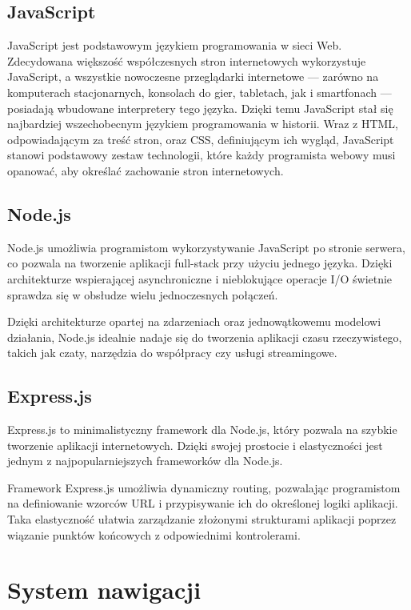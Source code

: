 \subsection{JavaScript}
JavaScript jest podstawowym językiem programowania w sieci Web. Zdecydowana większość współczesnych stron internetowych wykorzystuje JavaScript, a wszystkie nowoczesne przeglądarki internetowe — zarówno na komputerach stacjonarnych, konsolach do gier, tabletach, jak i smartfonach — posiadają wbudowane interpretery tego języka. Dzięki temu JavaScript stał się najbardziej wszechobecnym językiem programowania w historii. Wraz z HTML, odpowiadającym za treść stron, oraz CSS, definiującym ich wygląd, JavaScript stanowi podstawowy zestaw technologii, które każdy programista webowy musi opanować, aby określać zachowanie stron internetowych. \cite{flanagan2011javascript}


\subsection{Node.js}
Node.js umożliwia programistom wykorzystywanie JavaScript po stronie serwera, co pozwala na tworzenie aplikacji full-stack przy użyciu jednego języka. Dzięki architekturze wspierającej asynchroniczne i nieblokujące operacje I/O świetnie sprawdza się w obsłudze wielu jednoczesnych połączeń. \cite{peters2017building}

Dzięki architekturze opartej na zdarzeniach oraz jednowątkowemu modelowi działania, Node.js idealnie nadaje się do tworzenia aplikacji czasu rzeczywistego, takich jak czaty, narzędzia do współpracy czy usługi streamingowe. \cite{peters2017building}

\subsection{Express.js}
Express.js to minimalistyczny framework dla Node.js, który pozwala na szybkie tworzenie aplikacji internetowych. Dzięki swojej prostocie i elastyczności jest jednym z najpopularniejszych frameworków dla Node.js.

Framework Express.js umożliwia dynamiczny routing, pozwalając programistom na definiowanie wzorców URL i przypisywanie ich do określonej logiki aplikacji. Taka elastyczność ułatwia zarządzanie złożonymi strukturami aplikacji poprzez wiązanie punktów końcowych z odpowiednimi kontrolerami. \cite{peters2017building}

\section{System nawigacji}

